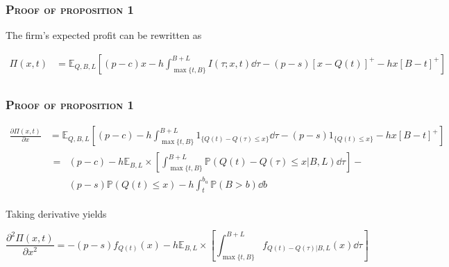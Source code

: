 \documentclass[aspectratio=169]{../presentation}
\begin{document}
    \begin{frame}
        \frametitle{\textsc{Proof of proposition 1}}

        The firm's expected profit can be rewritten as 

        \begin{equation}
            \begin{aligned}
                \Pi(x, t) &= \mathbb E_{Q, B, L}\left[(p-c)x - h\int_{\max\{t, B\}}^{B+L} I(\tau; x, t)\dd \tau -(p-s)\left[x-Q(t)\right]^+ - hx\left[B-t\right]^+\right] \\
            \end{aligned}
            \label{eq:8}
        \end{equation}

    \end{frame}

    \begin{frame}
        \frametitle{\textsc{Proof of proposition 1}}

        \begin{equation}
            \begin{aligned}
                \frac{\partial\Pi(x, t)}{\partial x} &= \mathbb E_{Q, B, L}\left[(p-c) - h\int_{\max\{t, B\}}^{B+L} 1_{\{Q(t) - Q(\tau)\leq x\}}\dd \tau -(p-s)1_{\{Q(t)\leq x\}} - hx\left[B-t\right]^+\right] \\
                &\begin{aligned}
                    =&(p-c) - h\mathbb E_{B, L}\times\left[\int_{\max\{t, B\}}^{B+L}\mathbb P(Q(t) - Q(\tau) \leq x|B, L)\dd \tau\right] - \\
                    &(p-s)\mathbb P(Q(t)\leq x) - h\int_t^{b_u}\mathbb P(B > b)\dd b
                \end{aligned}
            \end{aligned}
        \end{equation}

        Taking derivative yields

        \begin{equation}
            \frac{\partial^2\Pi(x, t)}{\partial x^2} = -(p-s)f_{Q(t)}(x) - h\mathbb E_{B, L}\times \left[\int_{\max\{t, B\}}^{B+L}f_{Q(t) - Q(\tau) | B, L}(x)\dd \tau\right]
        \end{equation}

    \end{frame}
\end{document}
